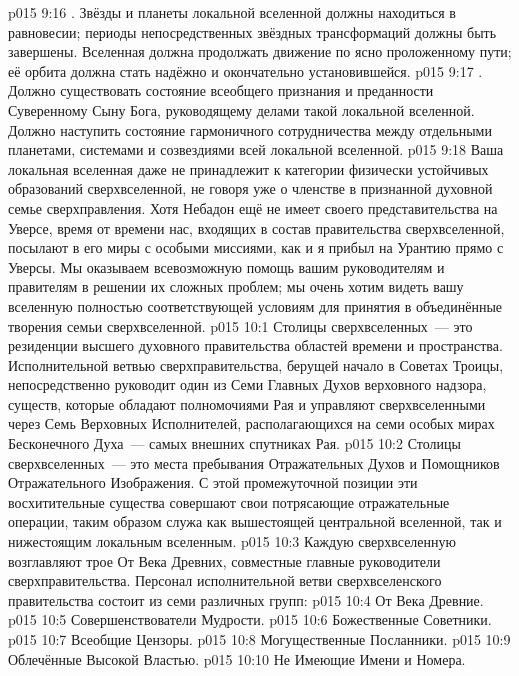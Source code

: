 \vs p015 9:16 . Звёзды и планеты локальной вселенной должны находиться в равновесии; периоды непосредственных звёздных трансформаций должны быть завершены. Вселенная должна продолжать движение по ясно проложенному пути; её орбита должна стать надёжно и окончательно установившейся.
\vs p015 9:17 . Должно существовать состояние всеобщего признания и преданности Суверенному Сыну Бога, руководящему делами такой локальной вселенной. Должно наступить состояние гармоничного сотрудничества между отдельными планетами, системами и созвездиями всей локальной вселенной.
\vs p015 9:18 \pc Ваша локальная вселенная даже не принадлежит к категории физически устойчивых образований сверхвселенной, не говоря уже о членстве в признанной духовной семье сверхправления. Хотя Небадон ещё не имеет своего представительства на Уверсе, время от времени нас, входящих в состав правительства сверхвселенной, посылают в его миры с особыми миссиями, как и я прибыл на Урантию прямо с Уверсы. Мы оказываем всевозможную помощь вашим руководителям и правителям в решении их сложных проблем; мы очень хотим видеть вашу вселенную полностью соответствующей условиям для принятия в объединённые творения семьи сверхвселенной.
\vs p015 10:1 Столицы сверхвселенных~--- это резиденции высшего духовного правительства областей времени и пространства. Исполнительной ветвью сверхправительства, берущей начало в Советах Троицы, непосредственно руководит один из Семи Главных Духов верховного надзора, существ, которые обладают полномочиями Рая и управляют сверхвселенными через Семь Верховных Исполнителей, располагающихся на семи особых мирах Бесконечного Духа~--- самых внешних спутниках Рая.
\vs p015 10:2 Столицы сверхвселенных~--- это места пребывания Отражательных Духов и Помощников Отражательного Изображения. С этой промежуточной позиции эти восхитительные существа совершают свои потрясающие отражательные операции, таким образом служа как вышестоящей центральной вселенной, так и нижестоящим локальным вселенным.
\vs p015 10:3 \pc Каждую сверхвселенную возглавляют трое От Века Древних, совместные главные руководители сверхправительства. Персонал исполнительной ветви сверхвселенского правительства состоит из семи различных групп:
\vs p015 10:4 От Века Древние.
\vs p015 10:5 Совершенствователи Мудрости.
\vs p015 10:6 Божественные Советники.
\vs p015 10:7 Всеобщие Цензоры.
\vs p015 10:8 Могущественные Посланники.
\vs p015 10:9 Облечённые Высокой Властью.
\vs p015 10:10 Не Имеющие Имени и Номера.
